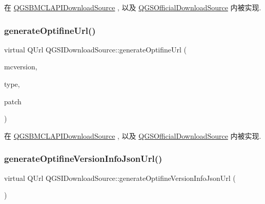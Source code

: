 在 \mbox{\hyperlink{class_q_g_s_b_m_c_l_a_p_i_download_source_ab33a32509621c2c0d2fef055bcf4cfd5}{Q\+G\+S\+B\+M\+C\+L\+A\+P\+I\+Download\+Source}} , 以及 \mbox{\hyperlink{class_q_g_s_official_download_source_a83a502b4513eb1286bc97a863ddf980c}{Q\+G\+S\+Official\+Download\+Source}} 内被实现.

\mbox{\label{class_q_g_s_i_download_source_a123c772c2a3f8431a96f676bc0e4cc91}} 
\subsubsection{\texorpdfstring{generate\+Optifine\+Url()}{generateOptifineUrl()}}
{\footnotesize\ttfamily virtual Q\+Url Q\+G\+S\+I\+Download\+Source\+::generate\+Optifine\+Url (\begin{DoxyParamCaption}\item[{const Q\+String \&}]{mcversion,  }\item[{const Q\+String \&}]{type,  }\item[{const Q\+String \&}]{patch }\end{DoxyParamCaption})\hspace{0.3cm}{\ttfamily [pure virtual]}}



在 \mbox{\hyperlink{class_q_g_s_b_m_c_l_a_p_i_download_source_a652a1fccb17bbb957f526d1a5dc03532}{Q\+G\+S\+B\+M\+C\+L\+A\+P\+I\+Download\+Source}} , 以及 \mbox{\hyperlink{class_q_g_s_official_download_source_a0bcd5b86c818cdd76195e16ccddb23da}{Q\+G\+S\+Official\+Download\+Source}} 内被实现.

\mbox{\label{class_q_g_s_i_download_source_a206fb5382716c8f34070eae836f9b742}} 
\subsubsection{\texorpdfstring{generate\+Optifine\+Version\+Info\+Json\+Url()}{generateOptifineVersionInfoJsonUrl()}}
{\footnotesize\ttfamily virtual Q\+Url Q\+G\+S\+I\+Download\+Source\+::generate\+Optifine\+Version\+Info\+Json\+Url (\begin{DoxyParamCaption}{ }\end{DoxyParamCaption})\hspace{0.3cm}{\ttfamily [pure virtual]}}



